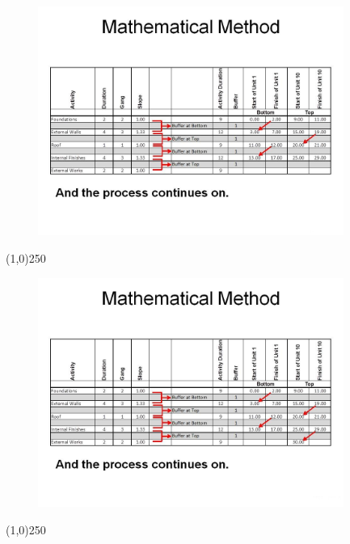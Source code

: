 \begin{frame}
\begin{figure}
	\centering
		\includegraphics[width = 10.0cm]{oldnotes/Slide293.jpg}
\end{figure}
\end{frame}
\begin{center}\line(1,0){250}\end{center}





\begin{frame}
\begin{figure}
	\centering
		\includegraphics[width = 10.0cm]{oldnotes/Slide294.jpg}
\end{figure}
\end{frame}
\begin{center}\line(1,0){250}\end{center}








